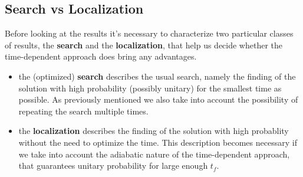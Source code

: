     \subsection{Search vs Localization}
      Before looking at the results it's necessary to characterize two particular classes of results, the \textbf{search} and the \textbf{localization}, that help us decide whether the time-dependent approach does bring any advantages.
      \begin{itemize}
          \item the (optimized) \textbf{search} describes the usual search, namely the finding of the solution with high probability (possibly unitary) for the smallest time as possible. As previously mentioned we also take into account the possibility of repeating the search multiple times.
          \item the \textbf{localization} describes the finding of the solution with high probablity without the need to optimize the time. This description becomes necessary if we take into account the adiabatic nature of the time-dependent approach, that guarantees unitary probability for large enough $t_f$.
      \end{itemize}

